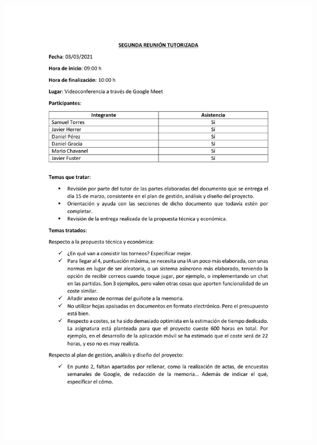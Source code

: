\documentclass{article}
\begin{document}
\includegraphics[width=\textwidth]{../images/actas/Acta_reunion_tutorizada_2.pdf}
\end{document}

